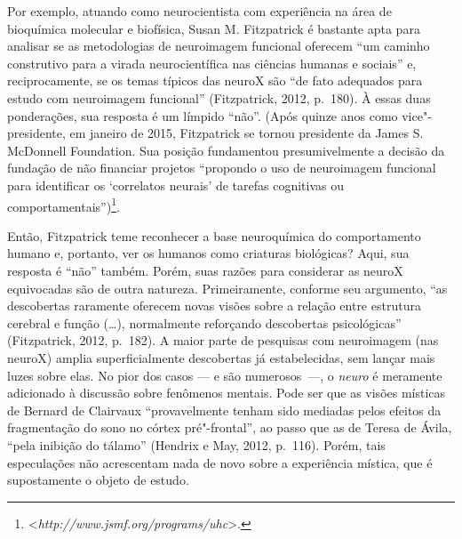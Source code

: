 Por exemplo, atuando como neurocientista com experiência na área de
bioquímica molecular e biofísica, Susan M. Fitzpatrick é bastante apta
para analisar se as metodologias de neuroimagem funcional oferecem ``um
caminho construtivo para a virada neurocientífica nas ciências humanas e
sociais'' e, reciprocamente, se os temas típicos das neuroX são ``de
fato adequados para estudo com neuroimagem funcional'' (Fitzpatrick,
2012, p.~180). À essas duas ponderações, sua resposta é um límpido
``não''. (Após quinze anos como vice"-presidente, em janeiro de 2015,
Fitzpatrick se tornou presidente da James S. McDonnell Foundation. Sua
posição fundamentou presumivelmente a decisão da fundação de não
financiar projetos ``propondo o uso de neuroimagem funcional para
identificar os `correlatos neurais' de tarefas cognitivas ou
comportamentais'')\footnote[6]{\textless{}\emph{http://www.jsmf.org/programs/uhc}\textgreater{}.}.

Então, Fitzpatrick teme reconhecer a base neuroquímica do comportamento
humano e, portanto, ver os humanos como criaturas biológicas? Aqui, sua
resposta é ``não'' também. Porém, suas razões para considerar as neuroX
equivocadas são de outra natureza. Primeiramente, conforme seu
argumento, ``as descobertas raramente oferecem novas visões sobre a
relação entre estrutura cerebral e função (\ldots{}), normalmente reforçando
descobertas psicológicas'' (Fitzpatrick, 2012, p.~182). A maior parte de
pesquisas com neuroimagem (nas neuroX) amplia superficialmente
descobertas já estabelecidas, sem lançar mais luzes sobre elas. No pior
dos casos --- e são numerosos~---, o \emph{neuro} é meramente adicionado
à discussão sobre fenômenos mentais. Pode ser que as visões místicas de
Bernard de Clairvaux ``provavelmente tenham sido mediadas pelos efeitos
da fragmentação do sono no córtex pré"-frontal'', ao passo que as de
Teresa de Ávila, ``pela inibição do tálamo'' (Hendrix e May, 2012,
p.~116). Porém, tais especulações não acrescentam nada de novo sobre a
experiência mística, que é supostamente o objeto de estudo.

